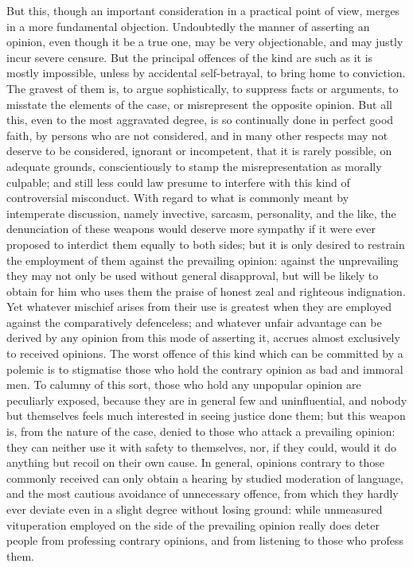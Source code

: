 \documentclass[11pt,openany]{book}
\begin{document}
But this, though an important consideration in a practical point of view, merges in a more fundamental objection. Undoubtedly the manner of asserting an opinion, even though it be a true one, may be very objectionable, and may justly incur severe censure. But the principal offences of the kind are such as it is mostly impossible, unless by accidental self-betrayal, to bring home to conviction. The gravest of them is, to argue sophistically, to suppress facts or arguments, to misstate the elements of the case, or misrepresent the opposite opinion. But all this, even to the most aggravated degree, is so continually done in perfect good faith, by persons who are not considered, and in many other respects may not deserve to be considered, ignorant or incompetent, that it is rarely possible, on adequate grounds, conscientiously to stamp the misrepresentation as morally culpable; and still less could law presume to interfere with this kind of controversial misconduct. With regard to what is commonly meant by intemperate discussion, namely invective, sarcasm, personality, and the like, the denunciation of these weapons would deserve more sympathy if it were ever proposed to interdict them equally to both sides; but it is only desired to restrain the employment of them against the prevailing opinion: against the unprevailing they may not only be used without general disapproval, but will be likely to obtain for him who uses them the praise of honest zeal and righteous indignation. Yet whatever mischief arises from their use is greatest when they are employed against the comparatively defenceless; and whatever unfair advantage can be derived by any opinion from this mode of asserting it, accrues almost exclusively to received opinions. The worst offence of this kind which can be committed by a polemic is to stigmatise those who hold the contrary opinion as bad and immoral men. To calumny of this sort, those who hold any unpopular opinion are peculiarly exposed, because they are in general few and uninfluential, and nobody but themselves feels much interested in seeing justice done them; but this weapon is, from the nature of the case, denied to those who attack a prevailing opinion: they can neither use it with safety to themselves, nor, if they could, would it do anything but recoil on their own cause. In general, opinions contrary to those commonly received can only obtain a hearing by studied moderation of language, and the most cautious avoidance of unnecessary offence, from which they hardly ever deviate even in a slight degree without losing ground: while unmeasured vituperation employed on the side of the prevailing opinion really does deter people from professing contrary opinions, and from listening to those who profess them.
\end{document}
